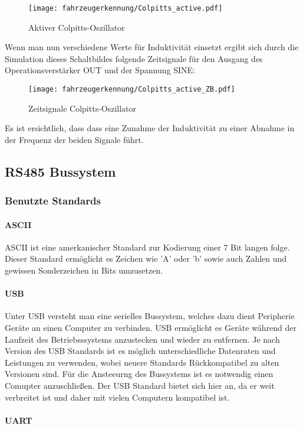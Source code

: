\begin{figure}[H]
    \centering
    \texttt{[image: fahrzeugerkennung/Colpitts\_active.pdf]}
    \caption{Aktiver Colpitts-Oszillator}
\end{figure}

Wenn man nun verschiedene Werte für Induktivität einsetzt ergibt sich durch die Simulation dieses Schaltbildes folgende Zeitsignale für den Ausgang des Operationsverstärker OUT und der Spannung SINE:

\begin{figure}[H]
    \centering
    \texttt{[image: fahrzeugerkennung/Colpitts\_active\_ZB.pdf]}
    \caption{Zeitsignale Colpitts-Oszillator}
\end{figure}

Es ist ersichtlich, dass dass eine Zunahme der Induktivität zu einer Abnahme in der Frequenz der beiden Signale führt.
\pagebreak
\subsection{RS485 Bussystem}
\subsubsection{Benutzte Standards}
\paragraph{ASCII}\mbox{}
ASCII ist eine amerkanischer Standard zur Kodierung einer 7 Bit langen folge. Dieser Standard ermöglicht es Zeichen wie 'A' oder 'b' sowie auch Zahlen und gewissen Sonderzeichen in Bits umzusetzen. 
\paragraph{USB}\mbox{}

Unter USB versteht man eine serielles Bussystem, welches dazu dient Peripherie Geräte an einen Computer zu verbinden. USB ermöglicht es Geräte während der Laufzeit des Betriebsssystems anzustecken und wieder zu entfernen.
Je nach Version des USB Standards ist es möglich unterschiedliche Datenraten und Leistungen zu verwenden, wobei neuere Standards Rückkompatibel zu alten Versionen sind. Für die Ansteeurng des Bussystems ist es notwendig einen Comupter anzuschließen. 
Der USB Standard bietet sich hier an, da er weit verbreitet ist und daher mit vielen Computern kompatibel ist.


\paragraph{UART}\mbox{}


